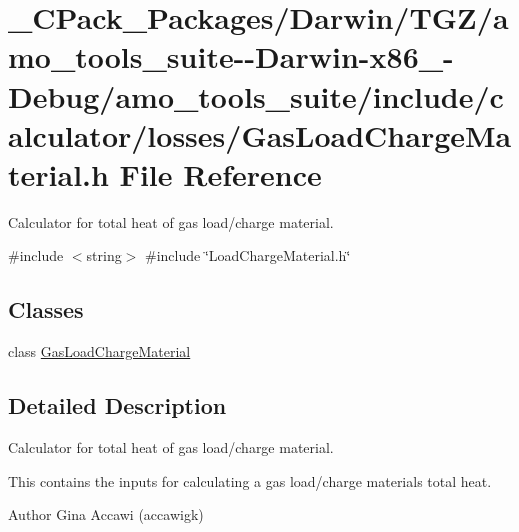 \hypertarget{___c_pack___packages_2_darwin_2_t_g_z_2amo__tools__suite--_darwin-x86__64-_debug_2amo__tools__su157dbf5ea34e89c33058a8ab90acfdb1}{}\section{\+\_\+\+C\+Pack\+\_\+\+Packages/\+Darwin/\+T\+G\+Z/amo\+\_\+tools\+\_\+suite-\/-\/\+Darwin-\/x86\+\_-\/\+Debug/amo\+\_\+tools\+\_\+suite/include/calculator/losses/\+Gas\+Load\+Charge\+Material.h File Reference}
\label{___c_pack___packages_2_darwin_2_t_g_z_2amo__tools__suite--_darwin-x86__64-_debug_2amo__tools__su157dbf5ea34e89c33058a8ab90acfdb1}


Calculator for total heat of gas load/charge material.  


{\ttfamily \#include $<$string$>$}\newline
{\ttfamily \#include \char`\"{}Load\+Charge\+Material.\+h\char`\"{}}\newline
\subsection*{Classes}
\begin{DoxyCompactItemize}
\item 
class \hyperlink{class_gas_load_charge_material}{Gas\+Load\+Charge\+Material}
\end{DoxyCompactItemize}


\subsection{Detailed Description}
Calculator for total heat of gas load/charge material. 

This contains the inputs for calculating a gas load/charge material\textquotesingle{}s total heat.

\begin{DoxyAuthor}{Author}
Gina Accawi (accawigk) 
\end{DoxyAuthor}
